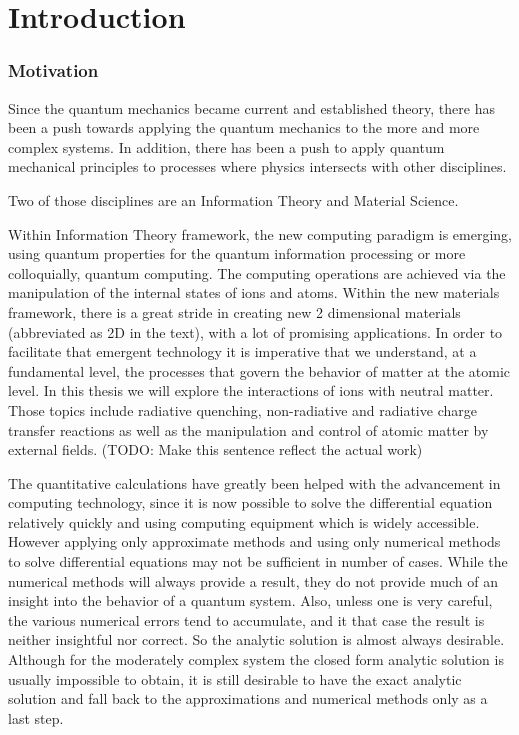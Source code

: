 \selectfont
\setcounter{chapter}{0}
\chapter*{\textbf{Introduction}}

\label{introduction}
 
\subsection*{Motivation}

Since the quantum mechanics became current and established theory, there has been a push towards applying the quantum mechanics to the more and more complex systems. In addition, there  has been a push to apply quantum mechanical principles to processes where physics intersects with other disciplines.

Two of those disciplines are an Information Theory and Material Science.

Within Information Theory framework, the new computing paradigm is emerging, using quantum properties for the quantum information processing \cite{QIP} or more colloquially, quantum computing. The computing operations are achieved via the manipulation of the internal states of ions and atoms. Within the new materials framework, there is a great stride in creating new 2 dimensional materials (abbreviated as 2D in the text), with a lot of promising applications.\cite{Nature2D}
In order to facilitate that emergent technology it is imperative that we understand, at a fundamental level, the processes that govern the behavior of matter at the atomic level. In this thesis we will explore the interactions of ions with neutral matter. Those topics include radiative quenching, non-radiative and radiative charge transfer reactions as well as the manipulation and control of atomic matter by external fields. (TODO: Make this sentence reflect the actual work)

The quantitative calculations have greatly been helped with the advancement in computing technology, since it is now possible to solve the differential equation relatively quickly and using computing equipment which is widely accessible.  However applying only approximate methods and using only numerical methods to solve differential equations may not be sufficient in number of cases. While the numerical methods will always provide a result, they do not provide much of an insight into the behavior of a quantum system. Also, unless one is very careful, the various numerical errors tend to accumulate, and it that case the result is neither insightful nor correct. So the analytic solution is almost always desirable. Although for the moderately complex system the closed form analytic solution is usually impossible to obtain, it is still desirable to have the exact analytic solution and fall back to the approximations and numerical methods only as a last step.

